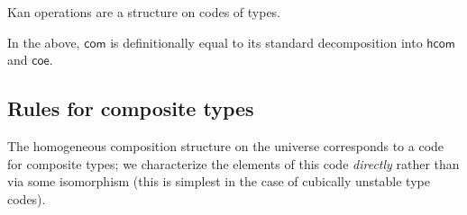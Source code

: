 \documentclass[draft]{amsart}
\begin{document}
Kan operations are a structure on codes of types.


In the above, $\mathsf{com}$ is definitionally equal to its standard
decomposition into $\mathsf{hcom}$ and $\mathsf{coe}$.

\subsection{Rules for composite types}

The homogeneous composition structure on the universe corresponds to a code for
composite types; we characterize the elements of this code \emph{directly}
rather than via some isomorphism (this is simplest in the case of cubically
unstable type codes).
\end{document}
